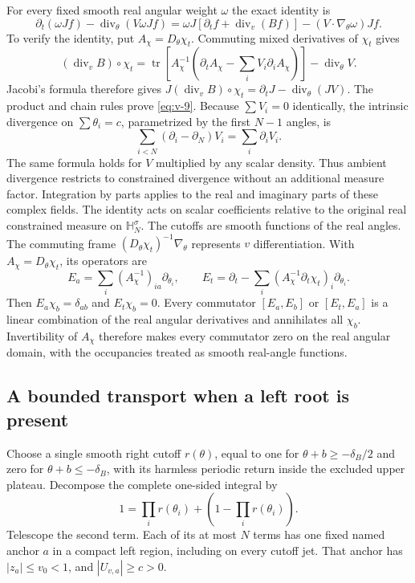 \documentclass[11pt]{article}
\numberwithin{equation}{section}
\theoremstyle{remark}\newtheorem{remark}[theorem]{Remark}
\begin{document}
For every fixed smooth real angular weight $\omega$ the exact identity
is
\begin{equation}\label{eq:v-9}
\partial_t(\omega Jf)-\operatorname{div}_\theta(V\omega Jf)
 =\omega J[\partial_tf+\operatorname{div}_v(Bf)]
    -(V\cdot\nabla_\theta\omega)Jf.
\end{equation}
To verify the identity, put $A_\chi=D_\theta\chi_t$.
Commuting mixed derivatives of $\chi_t$ gives
\[
 (\operatorname{div}_vB)\circ\chi_t
 =\operatorname{tr}\!\left[A_\chi^{-1}
   \left(\partial_tA_\chi-\sum_iV_i\partial_iA_\chi\right)\right]
     -\operatorname{div}_\theta V.
\]
Jacobi's formula therefore gives
$J(\operatorname{div}_vB)\circ\chi_t
=\partial_tJ-\operatorname{div}_\theta(JV)$.
The product and chain rules prove \eqref{eq:v-9}. Because $\sum V_i=0$ identically, the intrinsic divergence on
$\sum\theta_i=c$, parametrized by the first $N-1$ angles, is
\[
 \sum_{i<N}(\partial_i-\partial_N)V_i=\sum_i\partial_iV_i.
\]
The same formula holds for $V$ multiplied by any scalar density.
Thus ambient divergence restricts to constrained divergence without
an additional measure factor. Integration by parts applies to the
real and imaginary parts of these complex fields.
The identity acts on scalar coefficients relative to the original real
constrained measure on $\mathbb H_N^\sigma$. The cutoffs are smooth
functions of the real angles. The commuting frame
$(D_\theta\chi_t)^{-1}\nabla_\theta$ represents $v$ differentiation.
With $A_\chi=D_\theta\chi_t$, its operators are
\[
 E_a=\sum_i(A_\chi^{-1})_{ia}\partial_{\theta_i},\qquad
 E_t=\partial_t-
       \sum_i(A_\chi^{-1}\partial_t\chi_t)_i\partial_{\theta_i}.
\]
Then $E_a\chi_b=\delta_{ab}$ and $E_t\chi_b=0$. Every commutator
$[E_a,E_b]$ or $[E_t,E_a]$ is a linear combination of the real
angular derivatives and annihilates all $\chi_b$. Invertibility of
$A_\chi$ therefore makes every commutator zero on the real angular
domain, with the occupancies treated as smooth real-angle functions.

\subsection{A bounded transport when a left root is present}\label{sec:left-gap}

Choose a single smooth right cutoff $r(\theta)$, equal to one for
$\theta+b\ge-\delta_B/2$ and zero for
$\theta+b\le-\delta_B$, with its harmless periodic return inside the
excluded upper plateau. Decompose the complete one-sided integral by
\[
 1=\prod_i r(\theta_i)+\left(1-\prod_i r(\theta_i)\right).
\]
Telescope the second term. Each of its at most $N$ terms has one fixed
named anchor $a$ in a compact left region, including on every cutoff
jet. That anchor has $|z_a|\le v_0<1$, and $|U_{v,a}|\ge c>0$.
\end{document}
